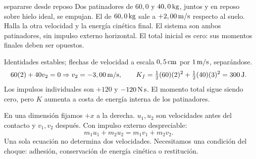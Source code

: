 \documentclass[11pt,a4paper]{article}
\begin{document}
\begin{examplebox}{separarse desde reposo}
 Dos patinadores de $60,0$ y $40,0\,\mathrm{kg}$, juntos y en reposo
sobre hielo ideal, se empujan. El de $60,0\,\mathrm{kg}$ sale a $+2,00\,\mathrm{m/s}$
respecto al suelo. Halla la otra velocidad y la energ\'ia cin\'etica final.
\solutionblock
{} El sistema son ambos patinadores, sin impulso externo horizontal.
El total inicial es cero: sus momentos finales deben ser opuestos.
\begin{center}
\end{center}
Identidades estables; flechas de velocidad a escala $0,5\,\mathrm{cm}$ por
$1\,\mathrm{m/s}$, separ\'andose.
\[
60(2)+40v_2=0\Rightarrow v_2=-3,00\,\mathrm{m/s},\qquad
K_f=\tfrac12(60)(2)^2+\tfrac12(40)(3)^2=300\,\mathrm{J}.
\]
 Los impulsos individuales son $+120$ y
$-120\,\mathrm{N\,s}$. El momento total sigue siendo cero, pero $K$ aumenta
a costa de energ\'ia interna de los patinadores.
\end{examplebox}

En una dimensi\'on fijamos $+x$ a la derecha. $u_1,u_2$ son velocidades
antes del contacto y $v_1,v_2$ despu\'es.
Con impulso externo despreciable:
\[
m_1u_1+m_2u_2=m_1v_1+m_2v_2.
\]
Una sola ecuaci\'on no determina dos velocidades. Necesitamos una condici\'on
del choque: adhesi\'on, conservaci\'on de energ\'ia cin\'etica o restituci\'on.
\end{document}
